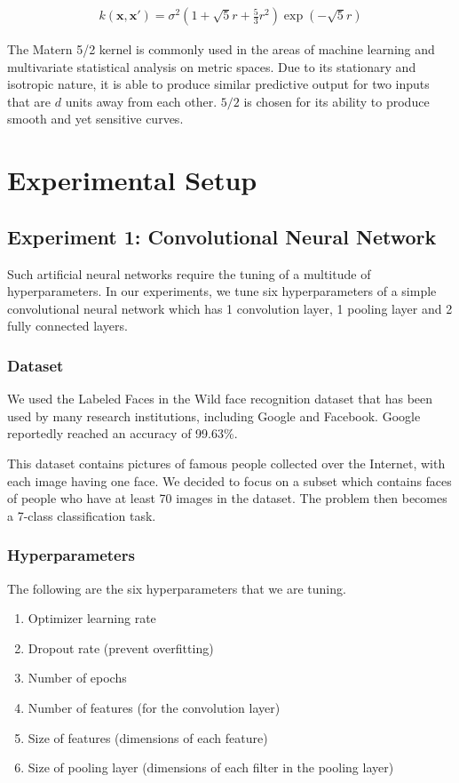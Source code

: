 \documentclass[letterpaper]{article}
\begin{document}
\begin{align*}
	k (\textbf{x},\textbf{x}') = \sigma^2(1+\sqrt5r+\frac{5}{3}r^2)\exp(-\sqrt5r)
\end{align*}

The Matern 5/2 kernel is commonly used in the areas of machine learning and multivariate statistical analysis on metric spaces. Due to its stationary and isotropic nature, it is able to produce similar predictive output for two inputs that are $d$ units away from each other. $5/2$ is chosen for its ability to produce smooth and yet sensitive curves.

\section{Experimental Setup}

\subsection{Experiment 1: Convolutional Neural Network}
Such artificial neural networks require the tuning of a multitude of hyperparameters.
In our experiments, we tune six hyperparameters of a simple convolutional neural 
network which has 1 convolution layer, 1 pooling layer and 2 fully connected layers.

\subsubsection{Dataset}
We used the Labeled Faces in the Wild face recognition dataset that has been used
by many research institutions, including Google and Facebook. Google reportedly 
reached an accuracy of 99.63\%.

This dataset contains pictures of famous people collected over the Internet, with 
each image having one face. We decided to focus on a subset which contains faces 
of people who have at least 70 images in the dataset. The problem then becomes 
a 7-class classification task.

\subsubsection{Hyperparameters}
The following are the six hyperparameters that we are tuning.

\begin{enumerate}

    \item Optimizer learning rate
    \item Dropout rate (prevent overfitting)
    \item Number of epochs
    \item Number of features (for the convolution layer)
    \item Size of features (dimensions of each feature)
    \item Size of pooling layer (dimensions of each filter in the pooling layer)

\end{enumerate}
\end{document}
